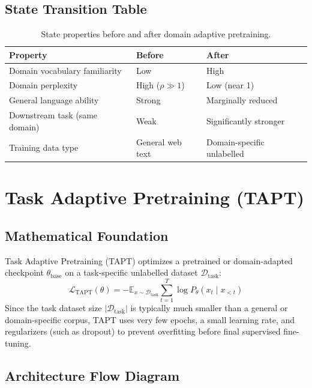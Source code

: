 \subsection{State Transition Table}
\begin{table}[h]\centering
\begin{tabular}{lll}\toprule
\textbf{Property} & \textbf{Before} & \textbf{After}\\\midrule
Domain vocabulary familiarity & Low & High\\
Domain perplexity & High ($\rho \gg 1$) & Low (near 1)\\
General language ability & Strong & Marginally reduced\\
Downstream task (same domain) & Weak & Significantly stronger\\
Training data type & General web text & Domain-specific unlabelled\\\bottomrule
\end{tabular}
\caption{State properties before and after domain adaptive pretraining.}
\end{table}

\newpage
\section{Task Adaptive Pretraining (TAPT)}

\subsection{Mathematical Foundation}
Task Adaptive Pretraining (TAPT) optimizes a pretrained or domain-adapted checkpoint $\theta_{\text{base}}$ on a task-specific unlabelled dataset $\mathcal{D}_{\text{task}}$:
\begin{equation}
  \mathcal{L}_{\text{TAPT}}(\theta) = -\mathbb{E}_{x \sim \mathcal{D}_{\text{task}}} \sum_{t=1}^T \log P_\theta(x_t \mid x_{<t})
\end{equation}
Since the task dataset size $|\mathcal{D}_{\text{task}}|$ is typically much smaller than a general or domain-specific corpus, TAPT uses very few epochs, a small learning rate, and regularizers (such as dropout) to prevent overfitting before final supervised fine-tuning.

\subsection{Architecture Flow Diagram}

